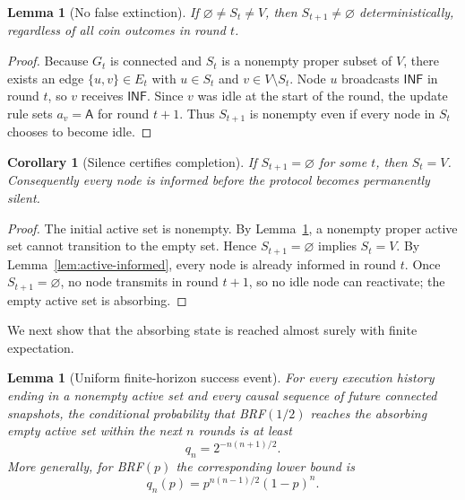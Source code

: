 \documentclass[11pt]{article}
\newtheorem{lemma}[theorem]{Lemma}
\newtheorem{corollary}[theorem]{Corollary}
\newcommand{\A}{\mathsf{A}}
\newcommand{\BRF}{\textsc{BRF}}
\begin{document}
\begin{lemma}[No false extinction]\label{lem:no-false-extinction}
If $\varnothing\neq S_t\neq V$, then $S_{t+1}\neq\varnothing$ deterministically, regardless of all coin outcomes in round $t$.
\end{lemma}

\begin{proof}
Because $G_t$ is connected and $S_t$ is a nonempty proper subset of $V$, there exists an edge $\{u,v\}\in E_t$ with $u\in S_t$ and $v\in V\setminus S_t$. Node $u$ broadcasts $\mathsf{INF}$ in round $t$, so $v$ receives $\mathsf{INF}$. Since $v$ was idle at the start of the round, the update rule sets $a_v=\A$ for round $t+1$. Thus $S_{t+1}$ is nonempty even if every node in $S_t$ chooses to become idle.\qedhere
\end{proof}

\begin{corollary}[Silence certifies completion]\label{cor:silence}
If $S_{t+1}=\varnothing$ for some $t$, then $S_t=V$. Consequently every node is informed before the protocol becomes permanently silent.
\end{corollary}

\begin{proof}
The initial active set is nonempty. By Lemma~\ref{lem:no-false-extinction}, a nonempty proper active set cannot transition to the empty set. Hence $S_{t+1}=\varnothing$ implies $S_t=V$. By Lemma~\ref{lem:active-informed}, every node is already informed in round $t$. Once $S_{t+1}=\varnothing$, no node transmits in round $t+1$, so no idle node can reactivate; the empty active set is absorbing.\qedhere
\end{proof}

We next show that the absorbing state is reached almost surely with finite expectation.

\begin{lemma}[Uniform finite-horizon success event]\label{lem:block-success}
For every execution history ending in a nonempty active set and every causal sequence of future connected snapshots, the conditional probability that \BRF$(1/2)$ reaches the absorbing empty active set within the next $n$ rounds is at least
\[
  q_n=2^{-n(n+1)/2}.
\]
More generally, for \BRF$(p)$ the corresponding lower bound is
\[
  q_n(p)=p^{n(n-1)/2}(1-p)^n.
\]
\end{lemma}
\end{document}
